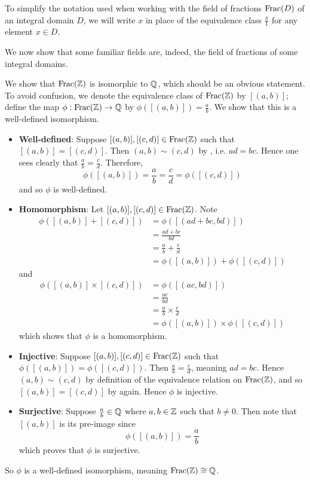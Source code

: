 To simplify the notation used when working with the field of fractions $\mathrm{Frac}(D)$ of an integral domain $D$, we will write $x$ in place of the equivalence class $\frac x1$ for any element $x \in D$.

We now show that some familiar fields are, indeed, the field of fractions of some integral domains.

\begin{example}
    We show that $\mathrm{Frac}(\mathbb{Z})$ is isomorphic to $\mathbb{Q}$, which should be an obvious statement. To avoid confusion, we denote the equivalence class of $\mathrm{Frac}(\mathbb{Z})$ by $[(a,b)]$; define the map $\phi: \mathrm{Frac}(\mathbb{Z}) \to \mathbb{Q}$ by $\phi([(a, b)]) = \frac ab$. We show that this is a well-defined isomorphism.
    \begin{itemize}
        \item \textbf{Well-defined}: Suppose $[(a, b)], [(c, d)] \in \mathrm{Frac}(\mathbb{Z})$ such that $[(a,b)]=[(c,d)]$. Then $(a, b) \mathrel{\sim} (c, d)$ by , i.e. $ad = bc$. Hence one sees clearly that $\frac ab = \frac cd$. Therefore,
        \[
            \phi([(a,b)]) = \frac ab = \frac cd = \phi([(c, d)])
        \]
        and so $\phi$ is well-defined.

        \item \textbf{Homomorphism}: Let $[(a, b)], [(c, d)] \in \mathrm{Frac}(\mathbb{Z})$. Note
        \begin{align*}
            \phi([(a,b)] + [(c,d)]) &= \phi([(ad+bc, bd)])\\
            &= \frac{ad+bc}{bd}\\
            &= \frac ab + \frac cd\\
            &= \phi([(a,b)]) + \phi([(c,d)])
        \end{align*}
        and
        \begin{align*}
            \phi([(a,b)] \times [(c,d)]) &= \phi([(ac, bd)])\\
            &= \frac{ac}{bd}\\
            &= \frac ab \times \frac cd\\
            &= \phi([(a,b)]) \times \phi([(c,d)])
        \end{align*}
        which shows that $\phi$ is a homomorphism.

        \item \textbf{Injective}: Suppose $[(a, b)], [(c, d)] \in \mathrm{Frac}(\mathbb{Z})$ such that $\phi([(a, b)]) = \phi([(c, d)])$. Then $\frac ab = \frac cd$, meaning $ad = bc$. Hence $(a, b) \mathrel{\sim} (c, d)$ by definition of the equivalence relation on $\mathrm{Frac}(\mathbb{Z})$, and so $[(a, b)] = [(c, d)]$ by  again. Hence $\phi$ is injective.

        \item \textbf{Surjective}: Suppose $\frac ab \in \mathbb{Q}$ where $a, b \in \mathbb{Z}$ such that $b \neq 0$. Then note that $[(a, b)]$ is its pre-image since
        \[
            \phi([(a, b)]) = \frac ab
        \]
        which proves that $\phi$ is surjective.
    \end{itemize}
    So $\phi$ is a well-defined isomorphism, meaning $\mathrm{Frac}(\mathbb{Z}) \cong \mathbb{Q}$.
\end{example}
